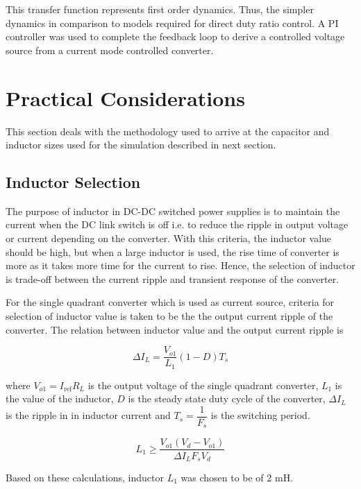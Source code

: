 \documentclass[a4paper]{IEEEtran}
\begin{document}
	This transfer function represents first order dynamics. Thus, the simpler dynamics in comparison to models required for direct duty ratio control. A PI controller was used to complete the feedback loop to derive a controlled voltage source from a current mode controlled converter.

\section{Practical Considerations}
\label{sec:practical-considerations}
	This section deals with the methodology used to arrive at the capacitor and inductor sizes used for the simulation described in next section.

\subsection{Inductor Selection}
	The purpose of inductor in DC-DC switched power supplies is to maintain the current when the DC link switch is off i.e. to reduce the ripple in output voltage or current depending on the converter. With this criteria, the inductor value should be high, but when a large inductor is used, the rise time of converter is more as it takes more time for the current to rise. Hence, the selection of inductor is trade-off between the current ripple and transient response of the converter. 

	For the single quadrant converter which is used as current source, criteria for selection of inductor value is taken to be the the output current ripple of the converter. The relation between inductor value and the output current ripple \cite{book:768263} is 

	\begin{equation}
		\Delta I_L = \dfrac{V_{o1}}{L_1} (1-D) T_s
		\label{eq:ind-1}
	\end{equation}

	where $V_{o1} = I_{\text{ref}} R_L$ is the output voltage of the single quadrant converter, $L_1$ is the value of the inductor, $D$ is the steady state duty cycle of the converter, $\Delta I_L$ is the ripple in in inductor current and $T_s = \dfrac{1}{F_s}$ is the switching period.

	\begin{equation}
		L_1 \geq \dfrac{V_{o1}(V_d-V_{o1})}{\Delta I_L F_s V_d}
		\label{eq:ind-1a}
	\end{equation}

	Based on these calculations, inductor $L_1$ was chosen to be of 2 mH. 
\end{document}
